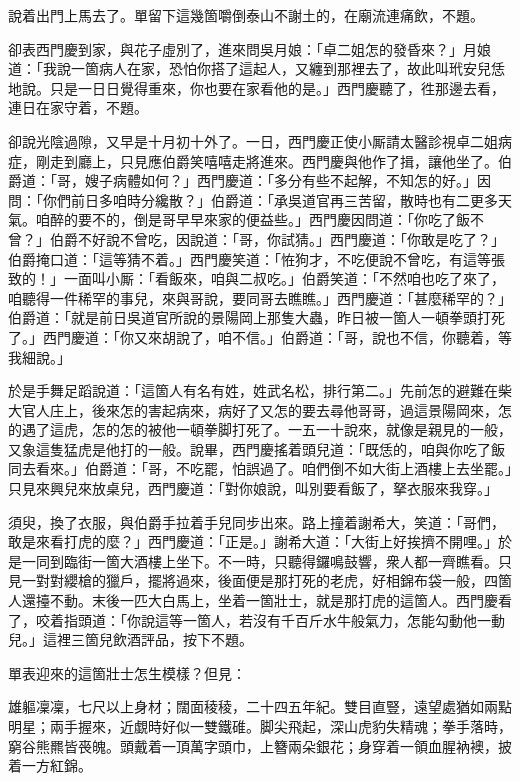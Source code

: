 說着出門上馬去了。單留下這幾箇嚼倒泰山不謝土的，在廟流連痛飲，不題。

卻表西門慶到家，與花子虛別了，進來問吳月娘：「卓二姐怎的發昏來？」月娘道：「我說一箇病人在家，恐怕你搭了這起人，又纏到那裡去了，故此叫玳安兒恁地說。只是一日日覺得重來，你也要在家看他的是。」西門慶聽了，徃那邊去看，連日在家守着，不題。

卻說光陰過隙，又早是十月初十外了。一日，西門慶正使小厮請太醫診視卓二姐病症，剛走到廳上，只見應伯爵笑嘻嘻走將進來。西門慶與他作了揖，讓他坐了。伯爵道：「哥，嫂子病體如何？」西門慶道：「多分有些不起解，不知怎的好。」因問：「你們前日多咱時分纔散？」伯爵道：「承吳道官再三苦留，散時也有二更多天氣。咱醉的要不的，倒是哥早早來家的便益些。」西門慶因問道：「你吃了飯不曾？」伯爵不好說不曾吃，因說道：「哥，你試猜。」西門慶道：「你敢是吃了？」伯爵掩口道：「這等猜不着。」{}西門慶笑道：「恠狗才，不吃便說不曾吃，有這等張致的！」一面叫小厮：「看飯來，咱與二叔吃。」伯爵笑道：「不然咱也吃了來了，咱聽得一件稀罕的事兒，來與哥說，要同哥去瞧瞧。」西門慶道：「甚麼稀罕的？」伯爵道：「就是前日吳道官所說的景陽岡上那隻大蟲，昨日被一箇人一頓拳頭打死了。」西門慶道：「你又來胡說了，咱不信。」伯爵道：「哥，說也不信，你聽着，等我細說。」

於是手舞足蹈說道：「這箇人有名有姓，姓武名松，排行第二。」先前怎的避難在柴大官人庄上，後來怎的害起病來，病好了又怎的要去尋他哥哥，過這景陽岡來，怎的遇了這虎，怎的怎的被他一頓拳脚打死了。一五一十說來，就像是親見的一般，又象這隻猛虎是他打的一般。說畢，西門慶搖着頭兒道：「既恁的，咱與你吃了飯同去看來。」伯爵道：「哥，不吃罷，怕誤過了。咱們倒不如大街上酒樓上去坐罷。」只見來興兒來放桌兒，西門慶道：「對你娘說，叫別要看飯了，拏衣服來我穿。」

須臾，換了衣服，與伯爵手拉着手兒同步出來。路上撞着謝希大，笑道：「哥們，敢是來看打虎的麼？」西門慶道：「正是。」謝希大道：「大街上好挨擠不開哩。」於是一同到臨街一箇大酒樓上坐下。不一時，只聽得鑼鳴鼓響，衆人都一齊瞧看。只見一對對纓槍的獵戶，擺將過來，後面便是那打死的老虎，好相錦布袋一般，四箇人還擡不動。末後一匹大白馬上，坐着一箇壯士，就是那打虎的這箇人。西門慶看了，咬着指頭道：「你說這等一箇人，若沒有千百斤水牛般氣力，怎能勾動他一動兒。」{}這裡三箇兒飲酒評品，按下不題。

單表迎來的這箇壯士怎生模樣？但見：

雄軀凜凜，七尺以上身材；闊面稜稜，二十四五年紀。雙目直豎，遠望處猶如兩點明星；兩手握來，近覷時好似一雙鐵碓。脚尖飛起，深山虎豹失精魂；拳手落時，窮谷熊羆皆䘮魄。頭戴着一頂萬字頭巾，上簪兩朵銀花；身穿着一領血腥衲襖，披着一方紅錦。

